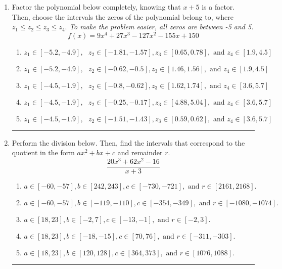 \documentclass[14pt]{extbook}
\newcommand{\litem}[1]{\item#1\hspace*{-1cm}\rule{\textwidth}{0.4pt}}
\begin{document}
\begin{enumerate}
{\begin{enumerate}[label=\Alph*.]
\end{enumerate} }
\litem{
Factor the polynomial below completely, knowing that $x + 5$ is a factor. Then, choose the intervals the zeros of the polynomial belong to, where $z_1 \leq z_2 \leq z_3 \leq z_4$. \textit{To make the problem easier, all zeros are between -5 and 5.}\[ f(x) = 9x^{4} +27 x^{3} -127 x^{2} -155 x + 150 \]\begin{enumerate}[label=\Alph*.]
\item \( z_1 \in [-5.2, -4.9], \text{   }  z_2 \in [-1.81, -1.57], z_3 \in [0.65, 0.78], \text{   and   } z_4 \in [1.9, 4.5] \)
\item \( z_1 \in [-5.2, -4.9], \text{   }  z_2 \in [-0.62, -0.5], z_3 \in [1.46, 1.56], \text{   and   } z_4 \in [1.9, 4.5] \)
\item \( z_1 \in [-4.5, -1.9], \text{   }  z_2 \in [-0.8, -0.62], z_3 \in [1.62, 1.74], \text{   and   } z_4 \in [3.6, 5.7] \)
\item \( z_1 \in [-4.5, -1.9], \text{   }  z_2 \in [-0.25, -0.17], z_3 \in [4.88, 5.04], \text{   and   } z_4 \in [3.6, 5.7] \)
\item \( z_1 \in [-4.5, -1.9], \text{   }  z_2 \in [-1.51, -1.43], z_3 \in [0.59, 0.62], \text{   and   } z_4 \in [3.6, 5.7] \)

\end{enumerate} }
\litem{
Perform the division below. Then, find the intervals that correspond to the quotient in the form $ax^2+bx+c$ and remainder $r$.\[ \frac{20x^{3} +62 x^{2} -16}{x + 3} \]\begin{enumerate}[label=\Alph*.]
\item \( a \in [-60, -57], b \in [242, 243], c \in [-730, -721], \text{ and } r \in [2161, 2168]. \)
\item \( a \in [-60, -57], b \in [-119, -110], c \in [-354, -349], \text{ and } r \in [-1080, -1074]. \)
\item \( a \in [18, 23], b \in [-2, 7], c \in [-13, -1], \text{ and } r \in [-2, 3]. \)
\item \( a \in [18, 23], b \in [-18, -15], c \in [70, 76], \text{ and } r \in [-311, -303]. \)
\item \( a \in [18, 23], b \in [120, 128], c \in [364, 373], \text{ and } r \in [1076, 1088]. \)


\end{enumerate}}
\end{enumerate}
\end{document}
